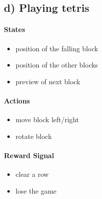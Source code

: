 \documentclass{article}
\begin{document}
\subsection*{d) Playing tetris}

\paragraph*{States}
\begin{itemize}
    \item position of the falling block
    \item position of the other blocks
    \item preview of next block
\end{itemize}


\paragraph*{Actions}
\begin{itemize}
    \item move block left/right
    \item rotate block
\end{itemize}

\paragraph*{Reward Signal}
\begin{itemize}
    \item clear a row
    \item lose the game
\end{itemize}
\end{document}

